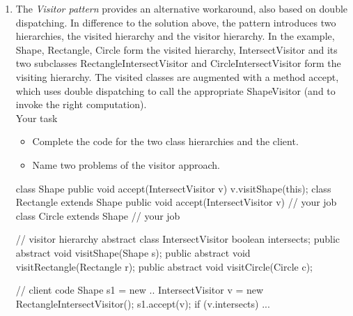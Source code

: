 \documentclass{article}
\begin{document}
\begin{enumerate}
\item The \textit{Visitor pattern} provides an alternative workaround,
also based on double dispatching. In difference
to the solution above, the pattern 
introduces two hierarchies, the visited
hierarchy and the visitor hierarchy. In the example,
 \textsf{Shape, Rectangle, Circle}
form the visited hierarchy, \textsf{IntersectVisitor} and its two
subclasses \textsf{RectangleIntersectVisitor} and \textsf{CircleIntersectVisitor}
form the visiting hierarchy. The visited classes are
augmented with a method \textsf{accept}, which uses double dispatching
to call the appropriate ShapeVisitor (and to invoke the
right computation). 
\\
Your task
\begin{itemize}
\item Complete the code for the two class hierarchies and the client.
\item Name two problems of the visitor approach.
\end{itemize}

\begin{java2}
class Shape {
    public void accept(IntersectVisitor v) {
	v.visitShape(this);
    }
}
class Rectangle extends Shape {
public  void accept(IntersectVisitor v) { 
        // your job
    }
}
class Circle extends Shape {
   // your job
}
 
// visitor hierarchy
abstract class IntersectVisitor { 
    boolean intersects; 
    public abstract void visitShape(Shape s);
    public abstract void visitRectangle(Rectangle r); 
    public abstract void visitCircle(Circle c); 
} 

// client code
  Shape s1 = new ..
  IntersectVisitor v = new RectangleIntersectVisitor();
  s1.accept(v);
  if (v.intersects) ...
\end{java2}
\end{enumerate}

\end{document}
